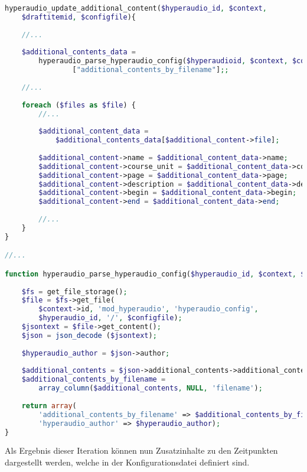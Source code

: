 \begin{lstlisting}[language=php,
             linewidth=\textwidth,
             caption={Ausschnitt der \textbf{locallib.php} in der 3. Iteration},
             label={lst:it3:locallib}]
hyperaudio_update_additional_content($hyperaudio_id, $context,
    $draftitemid, $configfile){
	
    //...
	
    $additional_contents_data = 
        hyperaudio_parse_hyperaudio_config($hyperaudioid, $context, $configfile)
                ["additional_contents_by_filename"];;
    
    //...
	
    foreach ($files as $file) {        
        //...
        
        $additional_content_data =
            $additional_contents_data[$additional_content->file];
        
        $additional_content->name = $additional_content_data->name;
        $additional_content->course_unit = $additional_content_data->course_unit;
        $additional_content->page = $additional_content_data->page;
        $additional_content->description = $additional_content_data->description;
        $additional_content->begin = $additional_content_data->begin;
        $additional_content->end = $additional_content_data->end;
        
        //...
    }    
}

//...

function hyperaudio_parse_hyperaudio_config($hyperaudio_id, $context, $configfile) {
    
    $fs = get_file_storage();
    $file = $fs->get_file(
        $context->id, 'mod_hyperaudio', 'hyperaudio_config',
        $hyperaudio_id, '/', $configfile);
    $jsontext = $file->get_content();
    $json = json_decode ($jsontext);
    
    $hyperaudio_author = $json->author;
    
    $additional_contents = $json->additional_contents->additional_content;
    $additional_contents_by_filename =
        array_column($additional_contents, NULL, 'filename');
    
    return array(
        'additional_contents_by_filename' => $additional_contents_by_filename,
        'hyperaudio_author' => $hyperaudio_author);
}
\end{lstlisting}



Als Ergebnis dieser Iteration können nun Zusatzinhalte zu den Zeitpunkten dargestellt werden, welche in der Konfigurationsdatei definiert sind.

